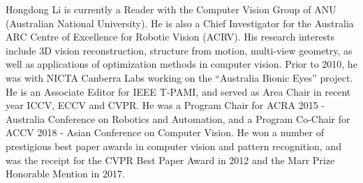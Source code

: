\documentclass[journal]{IEEEtran}
\begin{document}
\begin{IEEEbiography}{Hongdong Li} is currently a Reader with the Computer Vision Group of ANU (Australian National University). He is also a Chief Investigator for the Australia ARC Centre of Excellence for Robotic Vision (ACRV). His research interests include 3D vision reconstruction, structure from motion, multi-view geometry, as well as applications of optimization methods in computer vision.  Prior to 2010, he was with NICTA Canberra Labs working on the “Australia Bionic Eyes” project.  He is an Associate Editor for IEEE T-PAMI, and served as Area Chair in recent year ICCV, ECCV and CVPR.  He was a Program Chair for ACRA 2015 - Australia Conference on Robotics and Automation, and a Program Co-Chair for ACCV 2018 - Asian Conference on Computer Vision. He won a number of prestigious best paper awards in computer vision and pattern recognition, and was the receipt for the CVPR Best Paper Award in 2012 and the Marr Prize Honorable Mention in 2017. 

\end{IEEEbiography}









\end{document}

